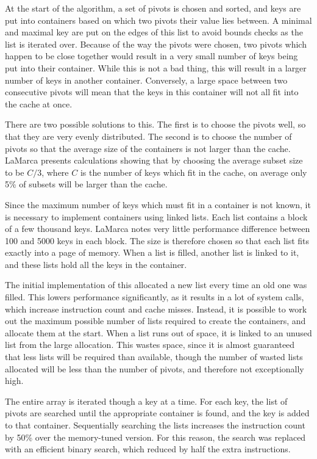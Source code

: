 At the start of the algorithm, a set of pivots is chosen and sorted, and keys
are put into containers based on which two pivots their value lies between. A
minimal and maximal key are put on the edges of this list to avoid bounds checks
as the list is iterated over. Because of the way the pivots were chosen, two
pivots which happen to be close together would result in a very small number of
keys being put into their container. While this is not a bad thing, this will
result in a larger number of keys in another container. Conversely, a large
space between two consecutive pivots will mean that the keys in this
container will not all fit into the cache at once.

There are two possible solutions to this. The first is to choose the pivots
well, so that they are very evenly distributed. The second is to choose the
number of pivots so that the average size of the containers is not larger than
the cache. LaMarca presents calculations showing that by choosing the average
subset size to be $C/3$, where $C$ is the number of keys which fit in the
cache, on average only 5\% of subsets will be larger than the cache.

Since the maximum number of keys which must fit in a container is not known, it
is necessary to implement containers using linked lists. Each list contains a
block of a few thousand keys. LaMarca notes very little performance difference
between 100 and 5000 keys in each block. The size is therefore chosen so that
each list fits exactly into a page of memory. When a list is filled, another
list is linked to it, and these lists hold all the keys in the container.

The initial implementation of this allocated a new list every time an old one
was filled. This lowers performance significantly, as it results in a lot of
system calls, which increase instruction count and cache misses. Instead, it is
possible to work out the maximum possible number of lists required to create the
containers, and allocate them at the start. When a list runs out of space, it is
linked to an unused list from the large allocation. This wastes space, since it
is almost guaranteed that less lists will be required than available, though the
number of wasted lists allocated will be less than the number of pivots, and
therefore not exceptionally high.

The entire array is iterated though a key at a time. For each key, the list
of pivots are searched until the appropriate container is found, and the key is
added to that container. Sequentially searching the lists increases the
instruction count by 50\% over the memory-tuned version. For this reason, the
search was replaced with an efficient binary search, which reduced by half the
extra instructions.

